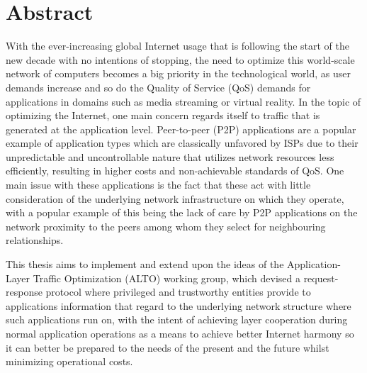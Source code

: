 \chapter*{Abstract}

    With the ever-increasing global Internet usage that is following the start of the new decade with no intentions of stopping, the need to optimize this world-scale network of computers becomes a big priority in the technological world, as user demands increase and so do the Quality of Service (QoS) demands for applications in domains such as media streaming or virtual reality.
    In the topic of optimizing the Internet, one main concern regards itself to traffic that is generated at the application level.
    Peer-to-peer (P2P) applications are a popular example of application types which are classically unfavored by ISPs due to their unpredictable and uncontrollable nature that utilizes network resources less efficiently, resulting in higher costs and non-achievable standards of QoS.
    One main issue with these applications is the fact that these act with little consideration of the underlying network infrastructure on which they operate, with a popular example of this being the lack of care by P2P applications on the network proximity to the peers among whom they select for neighbouring relationships.

    This thesis aims to implement and extend upon the ideas of the Application-Layer Traffic Optimization (ALTO) working group, which devised a request-response protocol where privileged and trustworthy entities provide to applications information that regard to the underlying network structure where such applications run on, with the intent of achieving layer cooperation during normal application operations as a means to achieve better Internet harmony so it can better be prepared to the needs of the present and the future whilst minimizing operational costs.

